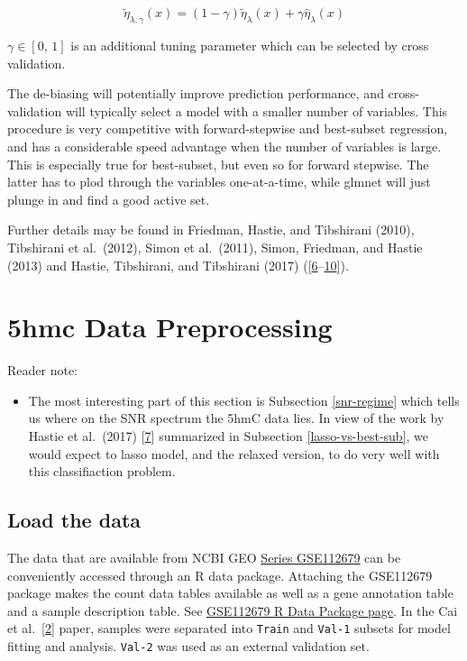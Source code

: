 \documentclass[
]{book}
\providecommand{\tightlist}{%
  \setlength{\itemsep}{0pt}\setlength{\parskip}{0pt}}
\begin{document}
\begin{equation}

\tilde{\eta}_{\lambda,\gamma}(x)=(1-\gamma)\tilde{\eta}_\lambda(x) + \gamma \hat{\eta}_\lambda(x)

 \label{eq:blended}
\end{equation}

\(\gamma \in [0,\, 1]\) is an additional tuning parameter which can be selected by cross validation.

The de-biasing will potentially improve prediction performance, and
cross-validation will typically select a model with a smaller number of variables.
This procedure is very competitive with forward-stepwise and
best-subset regression, and has a considerable speed advantage when the
number of variables is large. This is especially true for best-subset,
but even so for forward stepwise. The latter has to plod through the
variables one-at-a-time, while glmnet will just plunge in and find a good active set.

Further details may be found in
Friedman, Hastie, and Tibshirani (2010),
Tibshirani et al.~(2012),
Simon et al.~(2011),
Simon, Friedman, and Hastie (2013) and
Hastie, Tibshirani, and Tibshirani (2017)
({[}\protect\hyperlink{ref-Friedman:2010aa}{6}--\protect\hyperlink{ref-Simon:2013aa}{10}{]}).

\hypertarget{preproc}{%
\chapter{5hmc Data Preprocessing}\label{preproc}}

Reader note:

\begin{itemize}
\tightlist
\item
  The most interesting part of this section is Subsection \ref{snr-regime}
  which tells us where on the SNR spectrum the 5hmC data lies.
  In view of the work by Hastie et al.~(2017) {[}\protect\hyperlink{ref-Hastie:2017aa}{7}{]}
  summarized in Subsection \ref{lasso-vs-best-sub}, we would expect to
  lasso model, and the relaxed version, to do very well with this
  classifiaction problem.
\end{itemize}

\hypertarget{load-the-data}{%
\section{Load the data}\label{load-the-data}}

The data that are available from NCBI GEO
\href{https://www.ncbi.nlm.nih.gov/geo/query/acc.cgi?acc=GSE112679}{Series GSE112679}
can be conveniently accessed through an R data package.
Attaching the GSE112679 package makes the count data tables
available as well as a gene annotation table and a sample description table.
See \href{https://12379monty.github.io/GSE112679/}{GSE112679 R Data Package page}.
In the Cai et al.~{[}\protect\hyperlink{ref-Cai:2019aa}{2}{]} paper, samples were separated into
\texttt{Train} and \texttt{Val-1} subsets for model fitting and analysis.
\texttt{Val-2} was used as an external validation set.
\end{document}
